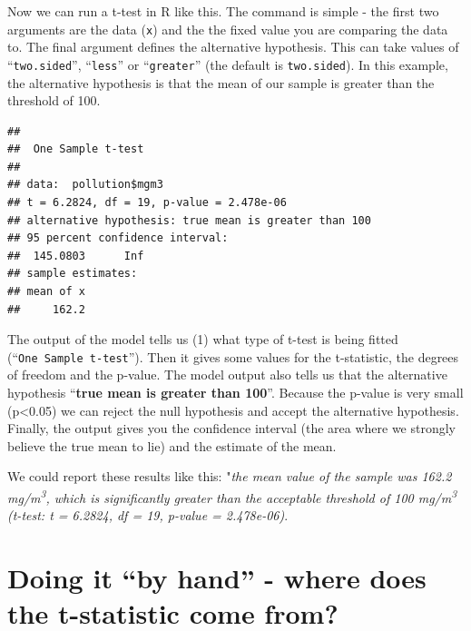 \documentclass[
  a4paperpaper,
]{book}
\newenvironment{Shaded}{\begin{snugshade}}{\end{snugshade}}
\newcommand{\DataTypeTok}[1]{\textcolor[rgb]{0.13,0.29,0.53}{#1}}
\newcommand{\DecValTok}[1]{\textcolor[rgb]{0.00,0.00,0.81}{#1}}
\newcommand{\KeywordTok}[1]{\textcolor[rgb]{0.13,0.29,0.53}{\textbf{#1}}}
\newcommand{\NormalTok}[1]{#1}
\newcommand{\OperatorTok}[1]{\textcolor[rgb]{0.81,0.36,0.00}{\textbf{#1}}}
\newcommand{\StringTok}[1]{\textcolor[rgb]{0.31,0.60,0.02}{#1}}
\begin{document}
Now we can run a t-test in R like this. The command is simple - the first two arguments are the data (\texttt{x}) and the the fixed value you are comparing the data to. The final argument defines the alternative hypothesis. This can take values of ``\texttt{two.sided}'', ``\texttt{less}'' or ``\texttt{greater}'' (the default is \texttt{two.sided}). In this example, the alternative hypothesis is that the mean of our sample is greater than the threshold of 100.

\begin{Shaded}
\end{Shaded}

\begin{verbatim}
## 
## 	One Sample t-test
## 
## data:  pollution$mgm3
## t = 6.2824, df = 19, p-value = 2.478e-06
## alternative hypothesis: true mean is greater than 100
## 95 percent confidence interval:
##  145.0803      Inf
## sample estimates:
## mean of x 
##     162.2
\end{verbatim}

The output of the model tells us (1) what type of t-test is being fitted (``\texttt{One\ Sample\ t-test}''). Then it gives some values for the t-statistic, the degrees of freedom and the p-value. The model output also tells us that the alternative hypothesis ``\textbf{true mean is greater than 100}''. Because the p-value is very small (p\textless0.05) we can reject the null hypothesis and accept the alternative hypothesis. Finally, the output gives you the confidence interval (the area where we strongly believe the true mean to lie) and the estimate of the mean.

We could report these results like this: "\emph{the mean value of the sample was 162.2 mg/m\textsuperscript{3}, which is significantly greater than the acceptable threshold of 100 mg/m\textsuperscript{3} (t-test: t = 6.2824, df = 19, p-value = 2.478e-06)}.

\hypertarget{doing-it-by-hand---where-does-the-t-statistic-come-from}{%
\section{Doing it ``by hand'' - where does the t-statistic come from?}\label{doing-it-by-hand---where-does-the-t-statistic-come-from}}
\end{document}
